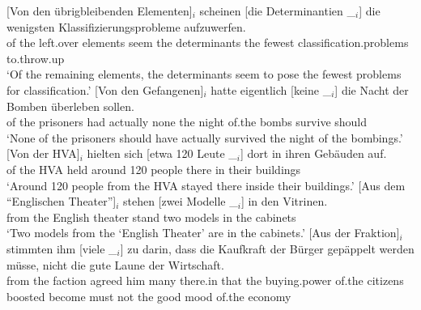 \begin{sloppypar}
\eal
\ex 
\gll {}[Von den übrigbleibenden Elementen]$_i$ scheinen [die Determinantien \_$_i$] die wenigsten Klassifizierungsprobleme aufzuwerfen.\footnotemark\\
     \spacebr{}of the left.over elements seem \spacebr{}the determinants {} the fewest classification.problems to.throw.up\\
\glt `Of the remaining elements, the determinants seem to pose the fewest problems for classification.'
\ex\label{bsp-von-den-gefangenen} 
\gll {}[Von den Gefangenen]$_i$ hatte eigentlich [keine \_$_i$] die Nacht der Bomben überleben sollen.\footnotemark\\
	 {}\spacebr{}of the prisoners had actually \spacebr{}none {} the night of.the bombs survive should\\
\glt `None of the prisoners should have actually survived the night of the bombings.'
\ex 
\gll {}[Von der HVA]$_i$ hielten sich [etwa 120 Leute \_$_i$] dort in ihren Gebäuden auf.\footnotemark\\
	 {}\spacebr{}of the HVA held \REFL{} \spacebr{}around 120 people {} there in their buildings \prt{}\\
\glt `Around 120 people from the HVA stayed there inside their buildings.'
\ex 
\gll {}[Aus dem "`Englischen Theater"']$_i$ stehen [zwei Modelle \_$_i$] in den Vitrinen.\footnotemark\hspace{-3pt}\\
	 {}\spacebr{}from the English theater stand \spacebr{}two models {} in the cabinets\\
\glt `Two models from the `English Theater' are in the cabinets.'
\ex 
\gll {}[Aus der Fraktion]$_i$ stimmten ihm [viele \_$_i$] zu darin, dass die Kaufkraft der Bürger gepäppelt werden müsse, nicht die gute Laune der Wirtschaft.\footnotemark\\
	 {}\spacebr{}from the faction agreed him \spacebr{}many {} \prt{} there.in that the buying.power of.the citizens boosted become must not the good mood of.the economy\\

\end{sloppypar}
